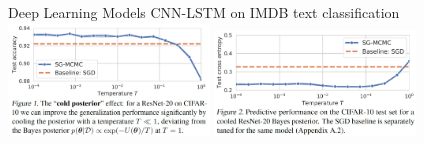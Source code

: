 \documentclass[mathserif,dvipsnames,table,xcdraw]{beamer}
\begin{document}
	\begin{frame}{Deep Learning Models}
		{CNN-LSTM on IMDB text classification}
		\centering
		\includegraphics[width=0.4\textwidth]{../figures/cold_post_1.png}
		\includegraphics[width=0.4\textwidth]{../figures/cold_post_2.png}
	\end{frame}
\end{document}

